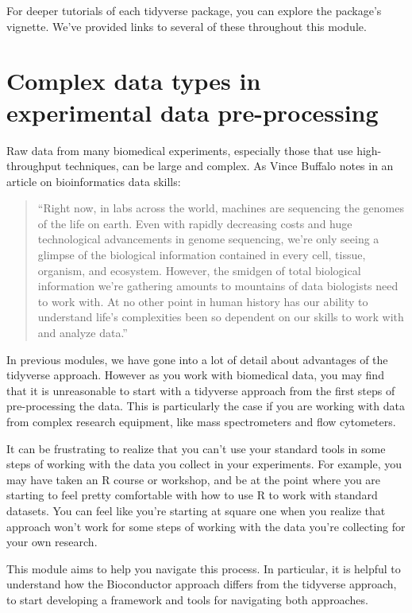 \documentclass[]{tufte-book}
\begin{document}
For deeper tutorials of each tidyverse package, you can explore the
package's vignette. We've provided links to several of these throughout this
module.

\section{Complex data types in experimental data pre-processing}\label{module15}

Raw data from many biomedical experiments, especially those that use
high-throughput techniques, can be large and complex. As Vince Buffalo
notes in an article on bioinformatics data skills:

\begin{quote}
``Right now, in labs across the world, machines are sequencing the genomes of
the life on earth. Even with rapidly decreasing costs and huge technological
advancements in genome sequencing, we're only seeing a glimpse of the biological
information contained in every cell, tissue, organism, and ecosystem. However,
the smidgen of total biological information we're gathering amounts to mountains
of data biologists need to work with. At no other point in human history has our
ability to understand life's complexities been so dependent on our skills to
work with and analyze data.'' \citep{buffalo2015bioinformatics}
\end{quote}

In previous modules, we have gone into a lot of detail about advantages of the
tidyverse approach. However as you work with biomedical data, you may find that
it is unreasonable to start with a tidyverse approach from the first steps of
pre-processing the data. This is particularly the case if you are working with
data from complex research equipment, like mass spectrometers and flow
cytometers.

It can be frustrating to realize that you can't use your standard tools
in some steps of working with the data you collect in your experiments.
For example, you may have taken an R course or workshop, and be at the
point where you are starting to feel pretty comfortable with how to use
R to work with standard datasets. You can feel like you're starting at
square one when you realize that approach won't work for some steps of
working with the data you're collecting for your own research.

This module aims to help you navigate this process. In particular, it is helpful
to understand how the Bioconductor approach differs from the tidyverse approach,
to start developing a framework and tools for navigating both approaches.
\end{document}
